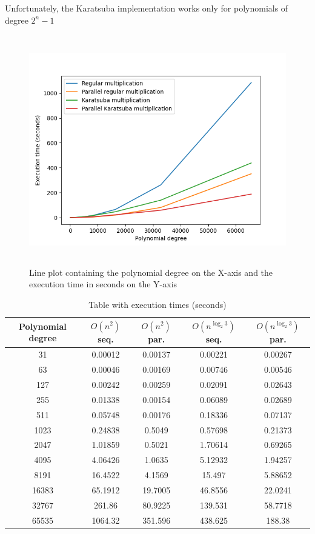 \documentclass[journal, onecolumn, 12pt]{IEEEtran}
\begin{document}
Unfortunately, the Karatsuba implementation works only for polynomials of degree $ 2^n - 1$


\begin{figure}[htbp]
\centering
\captionsetup{justification=centering,margin=2cm}
		\centerline{\includegraphics[width=18cm,height=10cm]{execution_time_plot.png}}
		\begin{center} 
		\caption{Line plot containing the polynomial degree on the X-axis and the execution time in seconds on the Y-axis}
		\end{center}
\label{fig}
\end{figure}


\begin{table}[ht]
		\caption{Table with execution times (seconds)} 
\begin{tabular}{c c c c c} 
\hline\hline                        
		Polynomial degree & $ O(n^2) $ seq. & $ O(n^2) $ par. & $ O(n^{\log_2 3}) $ seq. & $ O(n^{\log_2 3}) $ par. \\ [2ex]
\hline\hline                        
		31 & 0.00012 & 0.00137 & 0.00221 & 0.00267 \\    
		63 & 0.00046 & 0.00169 & 0.00746 & 0.00546  \\
		127 & 0.00242 & 0.00259 & 0.02091 & 0.02643  \\
		255  & 0.01338 & 0.00154 & 0.06089 & 0.02689 \\
		511 & 0.05748 & 0.00176 & 0.18336 & 0.07137 \\        
		1023 & 0.24838 & 0.5049 & 0.57698 & 0.21373 \\       
		2047 & 1.01859 & 0.5021 & 1.70614 & 0.69265 \\       
		4095 & 4.06426 & 1.0635 & 5.12932 & 1.94257 \\       
		8191 & 16.4522 & 4.1569 & 15.497 & 5.88652 \\       
		16383 & 65.1912 & 19.7005 & 46.8556 & 22.0241 \\      
		32767 & 261.86 & 80.9225 & 139.531 & 58.7718 \\      
		65535 & 1064.32 & 351.596 & 438.625 & 188.38 \\      
\hline\hline                        
\end{tabular}
\end{table}
	

		
\vspace{12pt}
\end{document}
